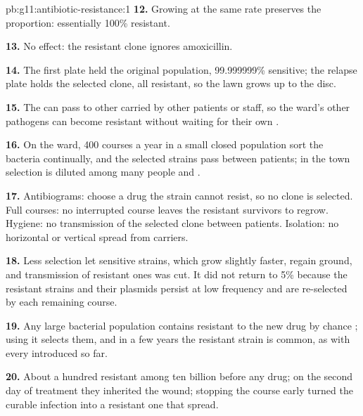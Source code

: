 \begin{solution}{pb:g11:antibiotic-resistance:1}
\textbf{12.} Growing at the same rate preserves the proportion:
essentially 100\% resistant.

\textbf{13.} No effect: the resistant clone ignores amoxicillin.

\textbf{14.} The first plate held the original population, 99.999999\%
sensitive; the relapse plate holds the selected clone, all resistant,
so the lawn grows up to the disc.

\textbf{15.} The  can pass to other  carried by other
patients or staff, so the ward's other pathogens can become resistant
without waiting for their own .

\textbf{16.} On the ward, 400 courses a year in a small closed
population sort the bacteria continually, and the selected strains
pass between patients; in the town selection is diluted among many
people and .

\textbf{17.} Antibiograms: choose a drug the strain cannot resist, so
no clone is selected. Full courses: no interrupted course leaves the
resistant survivors to regrow. Hygiene: no transmission of the
selected clone between patients. Isolation: no horizontal or
vertical spread from carriers.

\textbf{18.} Less selection let sensitive strains, which grow slightly
faster, regain ground, and transmission of resistant ones was cut. It
did not return to 5\% because the resistant strains and their
plasmids persist at low frequency and are re-selected by each
remaining course.

\textbf{19.} Any large bacterial population contains  resistant
to the new drug by chance ; using it selects them, and in a
few years the resistant strain is common, as with every 
introduced so far.

\textbf{20.} About a hundred resistant  among ten billion before
any drug; on the second day of treatment they inherited the wound;
stopping the course early turned the curable infection into a
resistant one that spread.
\end{solution}
